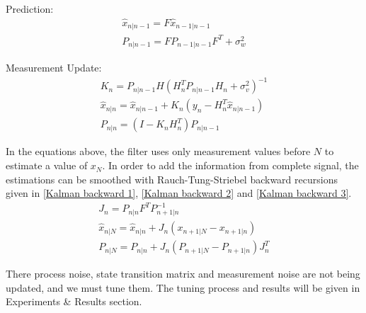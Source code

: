 Prediction:
\begin{align}
	\hat{{x}}_{n|n-1} = F\hat{{x}}_{n-1|n-1}\label{Kalman prediction 1}	\\
	P_{n|n-1} = FP_{n-1|n-1}F^T + \sigma_{w}^{2} \label{Kalman prediction 2}
\end{align}  \par
Measurement Update:
\begin{align}
	K_n = P_{n|n-1}H(H_n^TP_{n|n-1}H_n + \sigma_{v}^{2})^{-1} \label{Kalman measurement update 1} \\
	\hat{x}_{n|n} = \hat{x}_{n|n-1} + K_n(y_n - H_n^T\hat{x}_{n|n-1}) \label{Kalman measurement update 2} \\
	P_{n|n} = (I-K_nH_n^T)P_{n|n-1} \label{Kalman measurement update 3}
\end{align} \par
In the equations above, the filter uses only measurement values before $N$ to estimate a value of $x_N$. In order to add the information from complete signal, the estimations can be smoothed with Rauch-Tung-Striebel backward recursions given in \eqref{Kalman backward 1}, \eqref{Kalman backward 2} and \eqref{Kalman backward 3}.
\begin{align}
J_n = P_{n|n}F^TP_{n+1|n}^{-1}  \label{Kalman backward 1} \\
\hat{x}_{n|N} = \hat{x}_{n|n} + J_n(x_{n+1|N} - x_{n+1|n}) \label{Kalman backward 2} \\
P_{n|N} = P_{n|n} + J_n(P_{n+1|N} - P_{n+1|n})J_{n}^T \label{Kalman backward 3}
\end{align}  \par
There process noise, state transition matrix and measurement noise are not being updated, and we must tune them. The tuning process and results will be given in Experiments \& Results section.
